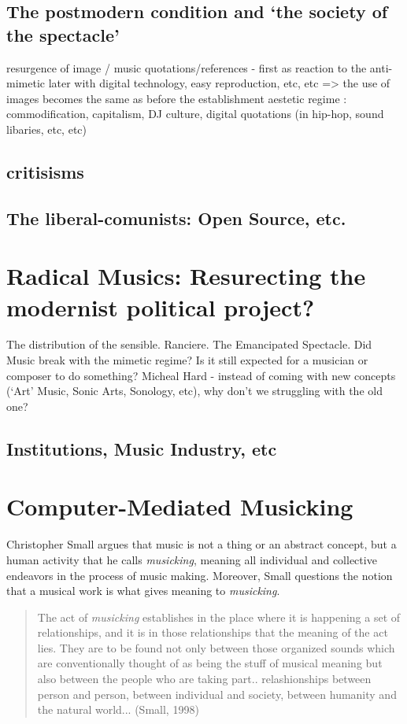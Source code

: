 \subsection{The postmodern condition and `the society of the spectacle'}

resurgence of image / music quotations/references - first as reaction to the anti-mimetic
later with digital technology, easy reproduction, etc, etc => the use of images becomes the same as before the establishment aestetic regime : commodification, capitalism, DJ culture, digital quotations (in hip-hop, sound libaries, etc, etc)

\subsection{critisisms} 
\subsection{The liberal-comunists: Open Source, etc.} 
 
\section{Radical Musics: Resurecting the modernist political project?}
The distribution of the sensible. Ranciere.
The Emancipated Spectacle.
Did Music break with the mimetic regime? Is it still expected for a musician or composer to do something? Micheal Hard - instead of coming with new concepts (`Art' Music, Sonic Arts, Sonology, etc), why don't we struggling with the old one?

\subsection{Institutions, Music Industry, etc} 

\section{Computer-Mediated Musicking}
Christopher Small argues that music is not a thing or an abstract concept, but a human activity that he calls \emph{musicking}, meaning all individual and collective endeavors in the process of music making. Moreover, Small questions the notion that a musical work is what gives meaning to \emph{musicking}. 

\begin{quote}
The act of \emph{musicking} establishes in the place where it is happening a set of relationships, and it is in those relationships that the meaning of the act lies. They are to be found not only between those organized sounds which are conventionally thought of as being the stuff of musical meaning but also between the people who are taking part.. relashionships between person and person, between individual and society, between humanity and the natural world... (Small, 1998)
\end{quote}

